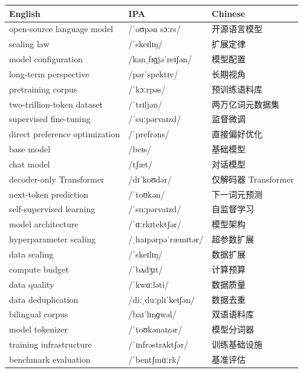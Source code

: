 \documentclass[UTF8,12pt,a4paper]{ctexart}
\providecommand{\zh}[1]{#1}
\begin{document}
\begin{tabular*}{\textwidth}{@{\extracolsep{\fill}}lll@{}}
\toprule
\textbf{English} & \textbf{IPA} & \textbf{Chinese} \\
\midrule
open-source language model & {\ipafont /ˈoʊpən sɔːrs/} & \zh{开源语言模型} \\
scaling law & {\ipafont /ˈskeɪlɪŋ/} & \zh{扩展定律} \\
model configuration & {\ipafont /kənˌfɪɡjəˈreɪʃən/} & \zh{模型配置} \\
long-term perspective & {\ipafont /pərˈspektɪv/} & \zh{长期视角} \\
pretraining corpus & {\ipafont /ˈkɔːrpəs/} & \zh{预训练语料库} \\
two-trillion-token dataset & {\ipafont /ˈtrɪljən/} & \zh{两万亿词元数据集} \\
supervised fine-tuning & {\ipafont /ˈsuːpərvaɪzd/} & \zh{监督微调} \\
direct preference optimization & {\ipafont /ˈprefrəns/} & \zh{直接偏好优化} \\
base model & {\ipafont /beɪs/} & \zh{基础模型} \\
chat model & {\ipafont /tʃæt/} & \zh{对话模型} \\
decoder-only Transformer & {\ipafont /dɪˈkoʊdər/} & \zh{仅解码器 Transformer} \\
next-token prediction & {\ipafont /ˈtoʊkən/} & \zh{下一词元预测} \\
self-supervised learning & {\ipafont /ˈsuːpərvaɪzd/} & \zh{自监督学习} \\
model architecture & {\ipafont /ˈɑːrkɪtektʃər/} & \zh{模型架构} \\
hyperparameter scaling & {\ipafont /ˌhaɪpərpəˈræmɪtər/} & \zh{超参数扩展} \\
data scaling & {\ipafont /ˈskeɪlɪŋ/} & \zh{数据扩展} \\
compute budget & {\ipafont /ˈbʌdʒɪt/} & \zh{计算预算} \\
data quality & {\ipafont /ˈkwɑːləti/} & \zh{数据质量} \\
data deduplication & {\ipafont /diːˌduːplɪˈkeɪʃən/} & \zh{数据去重} \\
bilingual corpus & {\ipafont /baɪˈlɪŋɡwəl/} & \zh{双语语料库} \\
model tokenizer & {\ipafont /ˈtoʊkənaɪzər/} & \zh{模型分词器} \\
training infrastructure & {\ipafont /ˈɪnfrəstrʌktʃər/} & \zh{训练基础设施} \\
benchmark evaluation & {\ipafont /ˈbentʃmɑːrk/} & \zh{基准评估} \\

\end{tabular*}
\end{document}

